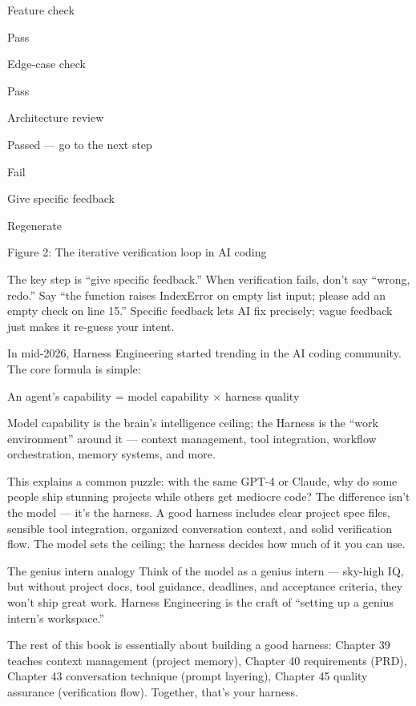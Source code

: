 Feature check

Pass

Edge-case check

Pass

Architecture review

Passed — go to the next step

Fail

Give specific feedback

Regenerate

\begin{center}\small\color{gray}Figure 2: The iterative verification loop in AI coding\end{center}

The key step is “give specific feedback.” When verification fails, don't say “wrong, redo.” Say “the function raises IndexError on empty list input; please add an empty check on line 15.” Specific feedback lets AI fix precisely; vague feedback just makes it re-guess your intent.


In mid-2026, Harness Engineering started trending in the AI coding community. The core formula is simple:

An agent's capability = model capability × harness quality

Model capability is the brain's intelligence ceiling; the Harness is the “work environment” around it — context management, tool integration, workflow orchestration, memory systems, and more.

This explains a common puzzle: with the same GPT-4 or Claude, why do some people ship stunning projects while others get mediocre code? The difference isn't the model — it's the harness. A good harness includes clear project spec files, sensible tool integration, organized conversation context, and solid verification flow. The model sets the ceiling; the harness decides how much of it you can use.

\begin{tcbinfo}{The genius intern analogy}
Think of the model as a genius intern — sky-high IQ, but without project docs, tool guidance, deadlines, and acceptance criteria, they won't ship great work. Harness Engineering is the craft of “setting up a genius intern's workspace.”

\end{tcbinfo}

The rest of this book is essentially about building a good harness: Chapter 39 teaches context management (project memory), Chapter 40 requirements (PRD), Chapter 43 conversation technique (prompt layering), Chapter 45 quality assurance (verification flow). Together, that's your harness.

